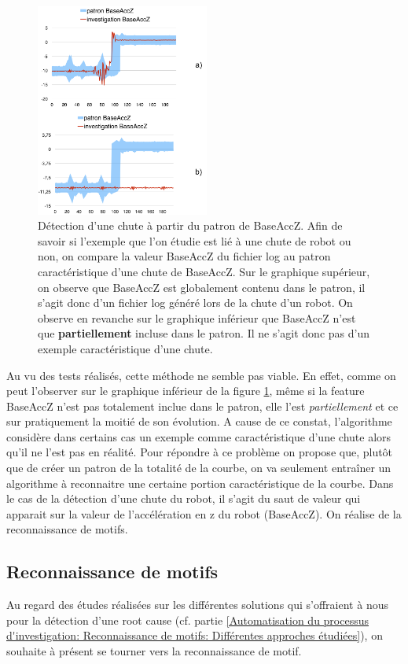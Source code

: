 \begin{figure}[H]
	\centering\includegraphics[height=7cm]{images/patron_comp.png}
	\caption[Détection d'une chute à partir du patron de BaseAccZ]{Détection d'une chute à partir du patron de BaseAccZ. Afin de savoir si l'exemple que l'on étudie est lié à une chute de robot ou non, on compare la valeur BaseAccZ du fichier log au patron caractéristique d'une chute de BaseAccZ. Sur le graphique supérieur, on observe que BaseAccZ est globalement contenu dans le patron, il s'agit donc d'un fichier log généré lors de la chute d'un robot. On observe en revanche sur le graphique inférieur que BaseAccZ n'est que \textbf{partiellement} incluse dans le patron. Il ne s'agit donc pas d'un exemple caractéristique d'une chute. }
	\label{fig:Détection d'une chute à partir du patron de BaseAccZ}
\end{figure}

Au vu des tests réalisés, cette méthode ne semble pas viable. En effet, comme on peut l'observer sur le graphique inférieur de la figure \ref{fig:Détection d'une chute à partir du patron de BaseAccZ}, même si la feature BaseAccZ n'est pas totalement inclue dans le patron, elle l'est \emph{partiellement} et ce sur pratiquement la moitié de son évolution. A cause de ce constat, l'algorithme considère dans certains cas un exemple comme caractéristique d'une chute alors qu'il ne l'est pas en réalité. Pour répondre à ce problème on propose que, plutôt que de créer un patron de la totalité de la courbe, on va seulement entraîner un algorithme à reconnaitre une certaine portion caractéristique de la courbe. Dans le cas de la détection d'une chute du robot, il s'agit du saut de valeur qui apparait sur la valeur de l'accélération en z du robot (BaseAccZ). On réalise de la reconnaissance de motifs. 

\subsection{Reconnaissance de motifs}
\label{Automatisation du processus d'investigation: Reconnaissance de motifs}
Au regard des études réalisées sur les différentes solutions qui s'offraient à nous pour la détection d'une root cause (cf. partie \ref{Automatisation du processus d'investigation: Reconnaissance de motifs: Différentes approches étudiées}), on souhaite à présent se tourner vers la reconnaissance de motif. 

